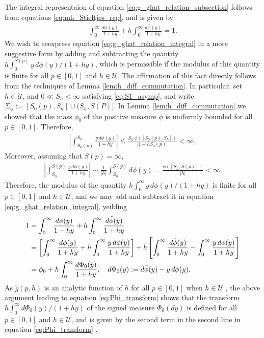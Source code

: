 \documentclass[english,12pt]{ttuthes}
\newcommand{\ph}{\hat{\phi}}
\begin{document}
The integral representaion of equation \eqref{eq:g_ghat_relation_subsection}
follows from equations \eqref{eq:mh_Stieltjes_rep}, and is given by
%
\begin{align}\label{eq:g_ghat_relation_integral}
  \int_0^\infty\frac{d\phi(y)}{1+hy}+h\int_0^\infty\frac{d\ph(y)}{1+hy}=1.
\end{align}
%
We wish to reexpress equation \eqref{eq:g_ghat_relation_integral} in a
more suggestive form by adding and subtracting the quantity
$h\int_0^{S(p)}y\,d\phi(y)/(1+hy)$, which is permissible if the modulus of
this quantity is finite for all $p\in[0,1]$ and $h\in\mathcal{U}$. The
affirmation of this fact directly follows from the techniques of Lemma
\ref{lem:h_diff_commutation}. In particular, set $h\in\mathcal{U}$,
and $0\ll S_h<\infty$ satisfying \eqref{eq:S1_asymp}, and write
$\Sigma_\phi:=[S_0(p),S_h]\cup(S_h,S(P)]$. In Lemma 
\ref{lem:h_diff_commutation} we showed that the mass $\phi_0$ of the
positive measure $\phi$ is uniformly bounded for all $p\in[0,1]$. Therefore,
%
\begin{align}\label{eq:L1(y_phi)_bound_finite_set}
 \left| \int_{S_0(p)}^{S_h}\frac{y\,d\phi(y)}{1+hy}\right|\leq
  \frac{S_h\,\phi([S_0(p),S_h])}{|1+hS_0(p)|}<\infty,
\end{align}
%
Moreover, assuming that $S(p)=\infty$,  
%
\begin{align}
 \left|\int_{S_h}^{S(p)}\frac{y\,d\phi(y)}{1+hy}\right|
     \sim\frac{1}{|h|}\int_{S_h}^{S(p)} d\phi(y)
     =\frac{\phi([S_h,S(p)])}{|h|}<\infty.
\end{align}
%
Therefore, the modulus of the quantity $h\int_0^\infty y\,d\phi(y)/(1+hy)$ is
finite for all $p\in[0,1]$ and $h\in\mathcal{U}$, and we may add and
subtract it in equation \eqref{eq:g_ghat_relation_integral}, 
yeilding   
%
\begin{align}\label{eq:Phi_transform}
   1&=\int_0^\infty\frac{d\phi(y)}{1+hy}+h\int_0^\infty\frac{d\ph(y)}{1+hy}\\
    &=\left[\int_0^\infty\frac{d\phi(y)}{1+hy}+h\int_0^\infty\frac{y\,d\phi(y)}{1+hy}\right]
    +h\left[\int_0^\infty\frac{d\ph(y)}{1+hy}-\int_0^\infty\frac{y\,d\phi(y)}{1+hy}\right]
    \notag\\
    &=\phi_0+h\int_0^\infty\frac{d\Phi_0(y)}{1+hy},\quad d\Phi_0(y):=d\ph(y)-y\,d\phi(y).\notag
\end{align}
%
As $\hat{g}(p,h)$ is an analytic function of $h$ for all $p\in[0,1]$
when $h\in\mathcal{U}$ \cite{Golden:CMP-473}, the above argument leading
to equation \eqref{eq:Phi_transform} shows that the transform
$h\int_0^\infty d\Phi_0(y)/(1+hy)$ of the signed measure \cite{Rudin:87}
$\Phi_0(dy)$ is defined for all $p\in[0,1]$ and $h\in\mathcal{U}$, and is
given by the second term in the second line in equation
\eqref{eq:Phi_transform} \cite{Rudin:87}.  
\end{document}

